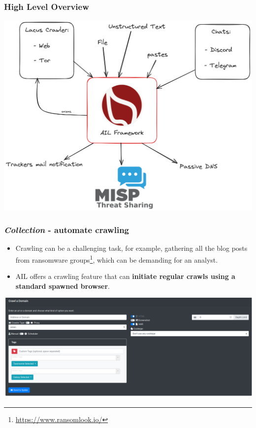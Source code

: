 \documentclass{beamer}
\begin{document}

\begin{frame}
    \frametitle{High Level Overview}
    \begin{center}
        \includegraphics[scale=0.24]{images/ail-overview.png}
    \end{center}
\end{frame}

\begin{frame}
    \frametitle{{\it Collection} - automate crawling}

\begin{itemize}
    \item Crawling can be a challenging task, for example, gathering all the blog posts from ransomware groups\footnote{\url{https://www.ransomlook.io/}}, which can be demanding for an analyst.
    \item AIL offers a crawling feature that can {\bf initiate regular crawls using a standard spawned browser}.
\end{itemize}
    \begin{center}
        \includegraphics[scale=0.17]{images/ail-crawling.png}
    \end{center}
\end{frame}
\end{document}
